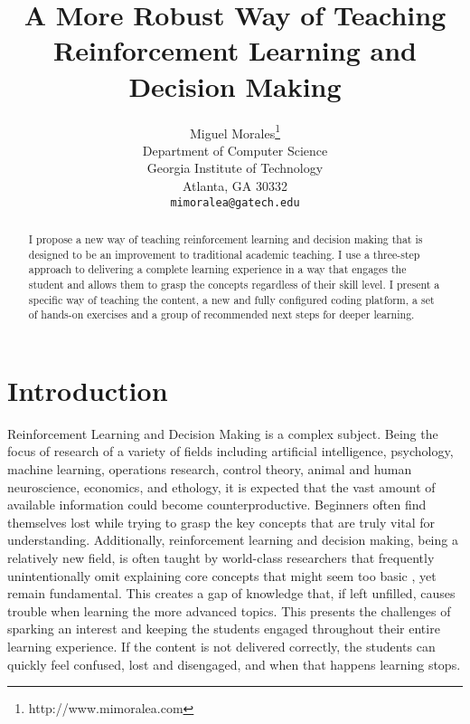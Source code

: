 \documentclass[11pt]{article} %
\title{A More Robust Way of Teaching Reinforcement Learning and Decision Making}
\author{
Miguel Morales\thanks{http://www.mimoralea.com} \\
Department of Computer Science \\
Georgia Institute of Technology \\
Atlanta, GA 30332 \\
\texttt{mimoralea@gatech.edu} \\
}
\begin{document}
\maketitle

\begin{abstract}
  I propose a new way of teaching reinforcement learning and decision making
  that is designed to be an improvement to traditional academic teaching. I use
  a three-step approach to delivering a complete learning experience in a
  way that engages the student and allows them to grasp the concepts regardless
  of their skill level. I present a specific way of teaching the content, a
  new and fully configured coding platform, a set of hands-on exercises and
  a group of recommended next steps for deeper learning.
\end{abstract}



\startmain %

\section{Introduction}

Reinforcement Learning and Decision Making is a complex subject. Being the
focus of research of a variety of fields including artificial intelligence,
psychology, machine learning, operations research, control theory, animal
and human neuroscience, economics, and ethology, it is expected that the
vast amount of available information could become counterproductive.
Beginners often find themselves lost while trying to grasp the key concepts
that are truly vital for understanding. Additionally, reinforcement learning
and decision making, being a relatively new field, is often taught by
world-class researchers that frequently unintentionally omit explaining
core concepts that might seem too basic \cite{gapranda}, yet remain
fundamental. This creates a gap of knowledge that, if left unfilled, causes
trouble when learning the more advanced topics. This presents the challenges of sparking an
interest and keeping the students engaged throughout their entire learning experience. If the
content is not delivered correctly, the students can quickly feel confused, lost and
disengaged, and when that happens learning stops.
\end{document}

